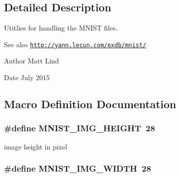 \subsection{Detailed Description}
Utitlies for handling the M\+N\+I\+S\+T files. 

\begin{DoxySeeAlso}{See also}
\href{http://yann.lecun.com/exdb/mnist/}{\tt http\+://yann.\+lecun.\+com/exdb/mnist/} 
\end{DoxySeeAlso}
\begin{DoxyAuthor}{Author}
Matt Lind 
\end{DoxyAuthor}
\begin{DoxyDate}{Date}
July 2015 
\end{DoxyDate}


\subsection{Macro Definition Documentation}
\hypertarget{mnist-utils_8h_a50bba24c079fe75bbae294ba50dbaa32}{}
\subsubsection[{M\+N\+I\+S\+T\+\_\+\+I\+M\+G\+\_\+\+H\+E\+I\+G\+H\+T}]{\setlength{\rightskip}{0pt plus 5cm}\#define M\+N\+I\+S\+T\+\_\+\+I\+M\+G\+\_\+\+H\+E\+I\+G\+H\+T~28}\label{mnist-utils_8h_a50bba24c079fe75bbae294ba50dbaa32}


image height in pixel 

\hypertarget{mnist-utils_8h_afa9a8f034b6b2dbc4f42ec4281cf2082}{}
\subsubsection[{M\+N\+I\+S\+T\+\_\+\+I\+M\+G\+\_\+\+W\+I\+D\+T\+H}]{\setlength{\rightskip}{0pt plus 5cm}\#define M\+N\+I\+S\+T\+\_\+\+I\+M\+G\+\_\+\+W\+I\+D\+T\+H~28}\label{mnist-utils_8h_afa9a8f034b6b2dbc4f42ec4281cf2082}


